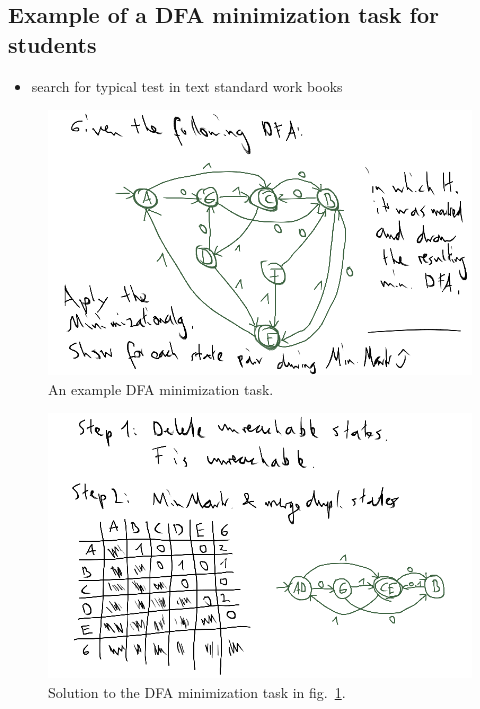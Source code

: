 \subsection{Example of a DFA minimization task for students}

\begin{itemize}
	\item search for typical test in text standard work books
\end{itemize}

\begin{figure}
\includegraphics[width=\linewidth]{images/dfa_ex_task.png}
\caption{An example DFA minimization task.}
\label{fig:dfa_ex_task}
\end{figure}

\begin{figure}
\includegraphics[width=\linewidth]{images/dfa_ex_sol.png}
\caption{Solution to the DFA minimization task in fig.~\ref{fig:dfa_ex_task}.}
\label{fig:dfa_ex_sol}
\end{figure}

